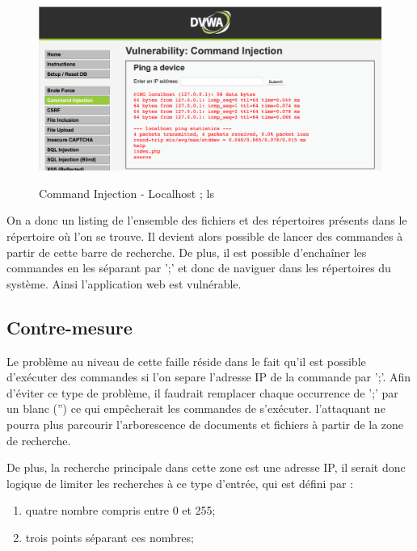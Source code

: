 \begin{figure}[!h]
\begin{center}

\label{inclusion}
\includegraphics[scale=0.5]{images/bf4.png}

\caption{Command Injection - Localhost ; ls}

\end{center}
\end{figure}

On a donc un listing de l'ensemble des fichiers et des répertoires présents dans le répertoire où l'on se trouve.
Il devient alors possible de lancer des commandes à partir de cette barre de recherche. De plus, il est possible d'enchaîner les commandes en les séparant par ';' et donc de naviguer dans les répertoires du système. Ainsi l'application web est vulnérable.


\subsection{Contre-mesure}

Le problème au niveau de cette faille réside dans le fait qu'il est possible d'exécuter des commandes si l'on separe l'adresse IP de la commande par ';'. Afin d'éviter ce type de problème, il faudrait remplacer chaque occurrence de ';' par un blanc ('') ce qui empêcherait les commandes de s'exécuter. l'attaquant ne pourra plus parcourir l'arborescence de documents et fichiers à partir de la zone de recherche.

De plus, la recherche principale dans cette zone est une adresse IP, il serait donc logique de limiter les recherches à ce type d'entrée, qui est défini par :

\begin{enumerate}
\item quatre nombre compris entre 0 et 255;
\item trois points séparant ces nombres;
\end{enumerate}

